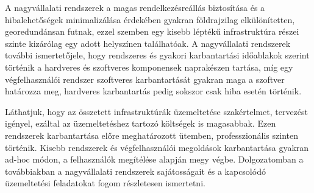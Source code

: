 A nagyvállalati rendszerek a magas rendelkezésreállás biztosítása és a hibalehetőségek minimalizálása érdekében gyakran földrajzilag elkülönítetten, georedundánsan futnak, ezzel szemben egy kisebb léptékű infrastruktúra részei szinte kizárólag egy adott helyszínen találhatóak. A nagyvállalati rendszerek további ismertetőjele, hogy rendszeres és gyakori karbantartási időablakok szerint történik a hardveres és szoftveres komponensek naprakészen tartása, míg egy végfelhasználói rendszer szoftveres karbantartását gyakran maga a szoftver határozza meg, hardveres karbantartás pedig sokszor csak hiba esetén történik.

Láthatjuk, hogy az összetett infrastruktúrák üzemeltetése szakértelmet, tervezést igényel, ezáltal az üzemeltetéshez tartozó költségek is magasabbak. Ezen rendszerek karbantartása előre meghatározott ütemben, professzionális szinten történik. Kisebb rendszerek és végfelhasználói megoldások karbantartása gyakran ad-hoc módon, a felhasználók megítélése alapján megy végbe. Dolgozatomban a továbbiakban a nagyvállalati rendszerek sajátosságait és a kapcsolódó üzemeltetési feladatokat fogom részletesen ismertetni.

